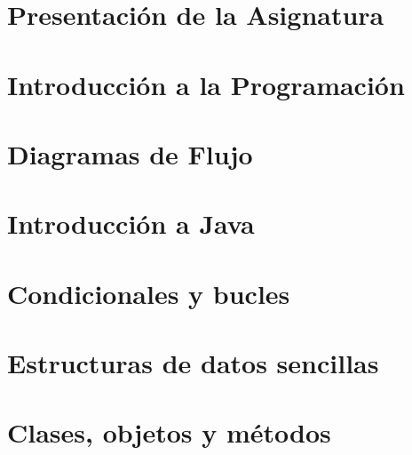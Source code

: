 \documentclass[12pt, twoside, openright]{report} %
\begin{document}




\part{Presentación de la Asignatura}


\part{Introducción a la Programación}



\part{Diagramas de Flujo}



\part{Introducción a Java}



\part{Condicionales y bucles}



\part{Estructuras de datos sencillas}



\part{Clases, objetos y métodos}


\end{document}
